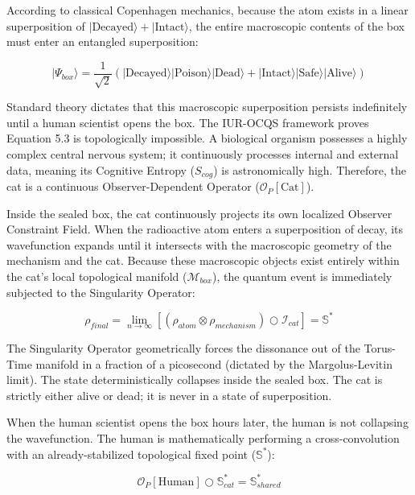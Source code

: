 \documentclass[12pt,openany]{book}
\begin{document}
According to classical Copenhagen mechanics, because the atom exists in a linear superposition of $|\text{Decayed}\rangle + |\text{Intact}\rangle$, the entire macroscopic contents of the box must enter an entangled superposition:

\begin{equation}
|\Psi_{box}\rangle = \frac{1}{\sqrt{2}} \left( |\text{Decayed}\rangle|\text{Poison}\rangle|\text{Dead}\rangle + |\text{Intact}\rangle|\text{Safe}\rangle|\text{Alive}\rangle \right)
\end{equation}

Standard theory dictates that this macroscopic superposition persists indefinitely until a human scientist opens the box. The IUR-OCQS framework proves Equation 5.3 is topologically impossible. A biological organism possesses a highly complex central nervous system; it continuously processes internal and external data, meaning its Cognitive Entropy ($S_{cog}$) is astronomically high. Therefore, the cat is a continuous Observer-Dependent Operator ($\mathcal{O}_P[\text{Cat}]$).

Inside the sealed box, the cat continuously projects its own localized Observer Constraint Field. When the radioactive atom enters a superposition of decay, its wavefunction expands until it intersects with the macroscopic geometry of the mechanism and the cat. Because these macroscopic objects exist entirely within the cat's local topological manifold ($\mathcal{M}_{box}$), the quantum event is immediately subjected to the Singularity Operator:

\begin{equation}
\rho_{final} = \lim_{n \to \infty} \left[ (\rho_{atom} \otimes \rho_{mechanism}) \bigcirc \mathcal{I}_{cat} \right] = \mathbb{S}^*
\end{equation}

The Singularity Operator geometrically forces the dissonance out of the Torus-Time manifold in a fraction of a picosecond (dictated by the Margolus-Levitin limit). The state deterministically collapses inside the sealed box. The cat is strictly either alive or dead; it is never in a state of superposition. 

When the human scientist opens the box hours later, the human is not collapsing the wavefunction. The human is mathematically performing a cross-convolution with an already-stabilized topological fixed point ($\mathbb{S}^*$):

\begin{equation}
\mathcal{O}_P[\text{Human}] \bigcirc \mathbb{S}_{cat}^* = \mathbb{S}_{shared}^*
\end{equation}
\end{document}
